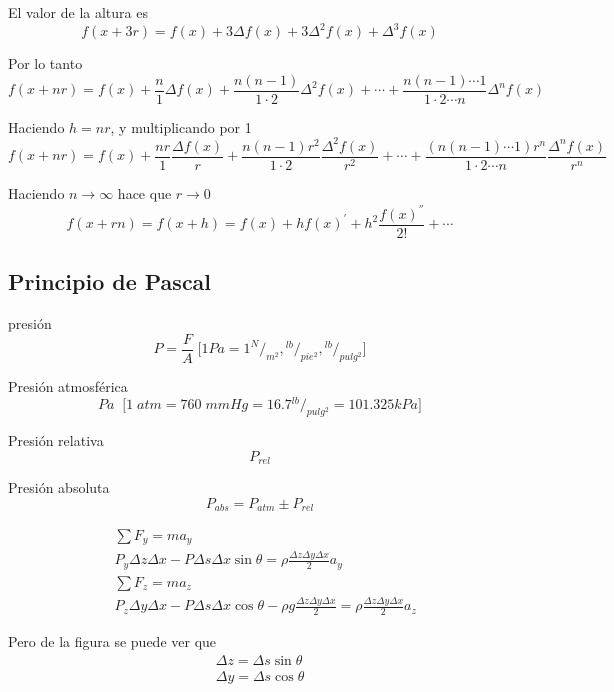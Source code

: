 El valor de la altura es
\[
    f(x + 3r) = f(x) + 3\Delta f(x) + 3\Delta^{2} f(x) + \Delta^{3}f(x)
\]

Por lo tanto
\[
    f(x + nr) = f(x) + \frac{ n }{ 1 } \Delta f(x) + \frac{ n(n - 1) }{ 1 \cdot 2 } \Delta^{2} f(x) + \cdots + \frac{ n(n - 1) \cdots 1 }{ 1 \cdot 2 \cdots n } \Delta^{n} f(x)
\]

Haciendo \( h = nr \), y multiplicando por 1
\[
    f(x + nr) = f(x) + \frac{ nr }{ 1 } \frac{ \Delta f(x) }{ r } + \frac{ n(n - 1) r^{2} }{ 1 \cdot 2 } \frac{ \Delta^{2} f(x) }{ r^{2} }  + \cdots + \frac{ ( n(n - 1) \cdots 1 ) r^{n} }{ 1 \cdot 2 \cdots n } \frac{ \Delta^{n} f(x) }{ r^{n} }
\]

Haciendo \( n \to \infty \) hace que \( r \to 0 \)
\[
    f(x + rn) = f(x + h) = f(x) + hf(x)^{'} + h^{2} \frac{ f(x)^{''} }{ 2! } + \cdots
\]

\subsection{Principio de Pascal}
presión 
\[
    P = \frac{ F }{ A } \; \Big[ 1Pa = {1}^{N}/_{m^{2}}, {}^{lb}/_{pie^{2}}, {}^{lb}/_{pulg^{2}} \Big]
\]

Presión atmosférica 
\[
    Pa \;\;
    \Big[ 1 \; atm = 760 \; mmHg = 16.7 {}^{lb}/_{pulg^{2}} = 101.325kPa \Big]
\]

Presión relativa
\[
    P_{rel} 
\]

Presión absoluta
\[
    P_{abs} = P_{atm} \pm P_{rel}
\]


\[
    \begin{split}
        & \sum F_{y} = ma_{y} \\
        & P_{y} \Delta z \Delta x - P \Delta s \Delta x \sin{ \theta } = \rho \frac{ \Delta z \Delta y \Delta x }{ 2 } a_{y} \\
        & \sum F_{z} = ma_{z} \\
        & P_{z} \Delta y \Delta x - P \Delta s \Delta x \cos{ \theta } - \rho g \frac{ \Delta z \Delta y \Delta x }{ 2 } = \rho \frac{ \Delta z \Delta y \Delta x }{ 2 } a_{z}
    \end{split}
\]

Pero de la figura se puede ver que
\[
    \begin{split}
        \Delta z = \Delta s \sin{ \theta } \\
        \Delta y = \Delta s \cos{ \theta }
    \end{split}
\]


